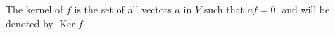 The kernel of $f$ is the set of all vectors $a$ in $V$ such that $af = 0$, and will be denoted by $\operatorname{Ker} f$.
